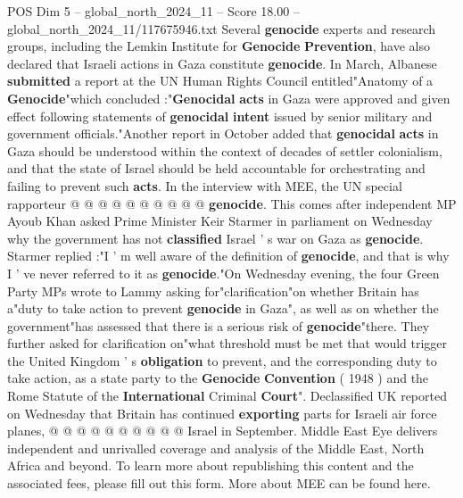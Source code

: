 \begin{textsample}{POS Dim 5 – global\_north\_2024\_11 – Score 18.00 – global\_north\_2024\_11/117675946.txt}
Several \textbf{genocide} experts and research groups, including the Lemkin Institute for \textbf{Genocide} \textbf{Prevention}, have also declared that Israeli actions in Gaza constitute \textbf{genocide}.
In March, Albanese \textbf{submitted} a report at the UN Human Rights Council entitled"Anatomy of a \textbf{Genocide}"which concluded :"\textbf{Genocidal} \textbf{acts} in Gaza were approved and given effect following statements of \textbf{genocidal} \textbf{intent} issued by senior military and government officials."Another report in October added that \textbf{genocidal} \textbf{acts} in Gaza should be understood within the context of decades of settler colonialism, and that the state of Israel should be held accountable for orchestrating and failing to prevent such \textbf{acts}.
In the interview with MEE, the UN special rapporteur @ @ @ @ @ @ @ @ @ @ \textbf{genocide}.
This comes after independent MP Ayoub Khan asked Prime Minister Keir Starmer in parliament on Wednesday why the government has not \textbf{classified} Israel ' s war on Gaza as \textbf{genocide}.
Starmer replied :"I ' m well aware of the definition of \textbf{genocide}, and that is why I ' ve never referred to it as \textbf{genocide}."On Wednesday evening, the four Green Party MPs wrote to Lammy asking for"clarification"on whether Britain has a"duty to take action to prevent \textbf{genocide} in Gaza", as well as on whether the government"has assessed that there is a serious risk of \textbf{genocide}"there.
They further asked for clarification on"what threshold must be met that would trigger the United Kingdom ' s \textbf{obligation} to prevent, and the corresponding duty to take action, as a state party to the \textbf{Genocide} \textbf{Convention} ( 1948 ) and the Rome Statute of the \textbf{International} Criminal \textbf{Court}".
Declassified UK reported on Wednesday that Britain has continued \textbf{exporting} parts for Israeli air force planes, @ @ @ @ @ @ @ @ @ @ Israel in September.
Middle East Eye delivers independent and unrivalled coverage and analysis of the Middle East, North Africa and beyond.
To learn more about republishing this content and the associated fees, please fill out this form.
More about MEE can be found here.

\end{textsample}
